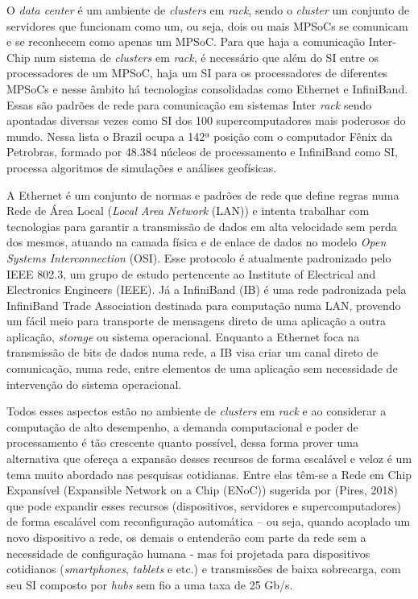 \documentclass[a4paper,12pt]{article}
\begin{document}
O \textit{data center} é um ambiente de \textit{clusters} em \textit{rack}, sendo o \textit{cluster} um conjunto de servidores que funcionam como um, ou seja, dois ou mais MPSoCs se comunicam e se reconhecem como apenas um MPSoC. Para que haja a comunicação Inter-Chip num sistema de \textit{clusters} em \textit{rack}, é necessário que além do SI entre os processadores de um MPSoC, haja um SI para os processadores de diferentes MPSoCs e nesse âmbito há tecnologias consolidadas como Ethernet e InfiniBand. Essas são padrões de rede para comunicação em sistemas Inter \textit{rack} sendo apontadas diversas vezes como SI dos 100 supercomputadores mais poderosos do mundo. Nessa lista o Brazil ocupa a 142ª posição com o computador Fênix da Petrobras, formado por 48.384 núcleos de processamento e InfiniBand como SI, processa algoritmos de simulações e análises geofísicas.

A Ethernet é um conjunto de normas e padrões de rede que define regras numa Rede de Área Local (\textit{Local Area Network} (LAN)) e intenta trabalhar com tecnologias para garantir a transmissão de dados em alta velocidade sem perda dos mesmos, atuando na camada física e de enlace de dados no modelo \textit{Open Systems Interconnection} (OSI). Esse protocolo é atualmente padronizado pelo IEEE 802.3, um grupo de estudo pertencente ao Institute of Electrical and Electronics Engineers (IEEE). Já a InfiniBand (IB) é uma rede padronizada pela InfiniBand Trade Association destinada para computação numa LAN, provendo um fácil meio para transporte de mensagens direto de uma aplicação a outra aplicação, \textit{storage} ou sistema operacional. Enquanto a Ethernet foca na transmissão de bits de dados numa rede, a IB visa criar um canal direto de comunicação, numa rede, entre elementos de uma aplicação sem necessidade de intervenção do sistema operacional.

Todos esses aspectos estão no ambiente de \textit{clusters} em \textit{rack} e ao considerar a computação de alto desempenho, a demanda computacional e poder de processamento é tão crescente quanto possível, dessa forma prover uma alternativa que ofereça a expansão desses recursos de forma escalável e veloz é um tema muito abordado nas pesquisas cotidianas. Entre elas têm-se a Rede em Chip Expansível (Expansible Network on a Chip (ENoC)) sugerida por (Pires, 2018) que pode expandir esses recursos (dispositivos, servidores e supercomputadores) de forma escalável com reconfiguração automática – ou seja, quando acoplado um novo dispositivo a rede, os demais o entenderão com parte da rede sem a necessidade de configuração humana - mas foi projetada para dispositivos cotidianos (\textit{smartphones}, \textit{tablets} e etc.) e transmissões de baixa sobrecarga, com seu SI composto por \textit{hubs} sem fio a uma taxa de 25 Gb/s.
\end{document}

